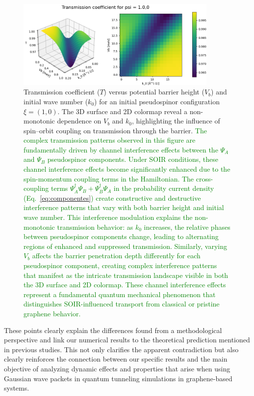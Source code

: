 \begin{figure}%
        \centering
        \includegraphics[width=0.88\textwidth]{../assets/images/Rashba/TCoefficient(1.0,0)xalpha=0.2beta=-0.2}
        \caption{Transmission coefficient ($T$) versus potential barrier height ($V_b$) and initial wave number ($k_0$) for an initial pseudospinor configuration $\xi = (1, 0)$. The 3D surface and 2D colormap reveal a non-monotonic dependence on $V_b$ and $k_0$, highlighting the influence of spin–orbit coupling on transmission through the barrier. \textcolor{green}{The complex transmission patterns observed in this figure are fundamentally driven by channel interference effects between the $\Psi_A$ and $\Psi_B$ pseudospinor components. Under SOIR conditions, these channel interference effects become significantly enhanced due to the spin-momentum coupling terms in the Hamiltonian. The cross-coupling terms $\Psi_A^\dagger\Psi_B + \Psi_B^\dagger\Psi_A$ in the probability current density (Eq.~\ref{eq:componentes}) create constructive and destructive interference patterns that vary with both barrier height and initial wave number. This interference modulation explains the non-monotonic transmission behavior: as $k_0$ increases, the relative phases between pseudospinor components change, leading to alternating regions of enhanced and suppressed transmission. Similarly, varying $V_b$ affects the barrier penetration depth differently for each pseudospinor component, creating complex interference patterns that manifest as the intricate transmission landscape visible in both the 3D surface and 2D colormap. These channel interference effects represent a fundamental quantum mechanical phenomenon that distinguishes SOIR-influenced transport from classical or pristine graphene behavior.}}
        \label{fig:rashba}
\end{figure}

These points clearly explain the differences found from a methodological perspective and link our numerical results to the theoretical prediction mentioned in previous studies.
This not only clarifies the apparent contradiction but also clearly reinforces the connection between our specific results and the main objective of analyzing dynamic effects and properties that arise when using Gaussian wave packets in quantum tunneling simulations in graphene-based systems.

